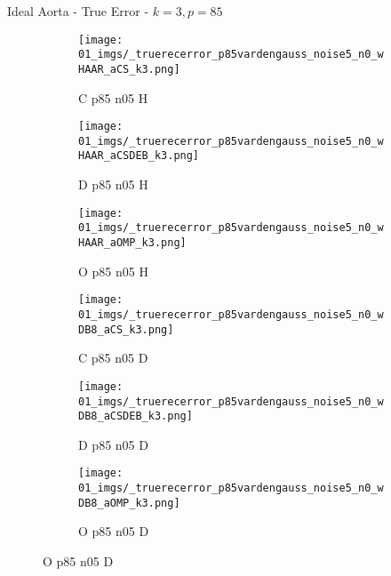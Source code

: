 \begin{frame}{Ideal Aorta - True Error - $k=3,p=85$}{}
\begin{figure}
\begin{subfigure}{0.13\textwidth}
\texttt{[image: 01\_imgs/\_truerecerror\_p85vardengauss\_noise5\_n0\_wHAAR\_aCS\_k3.png]}
\caption*{\tiny C p85 n05 H}
\end{subfigure}
\begin{subfigure}{0.13\textwidth}
\texttt{[image: 01\_imgs/\_truerecerror\_p85vardengauss\_noise5\_n0\_wHAAR\_aCSDEB\_k3.png]}
\caption*{\tiny D p85 n05 H}
\end{subfigure}
\begin{subfigure}{0.13\textwidth}
\texttt{[image: 01\_imgs/\_truerecerror\_p85vardengauss\_noise5\_n0\_wHAAR\_aOMP\_k3.png]}
\caption*{\tiny O p85 n05 H}
\end{subfigure}
\begin{subfigure}{0.13\textwidth}
\texttt{[image: 01\_imgs/\_truerecerror\_p85vardengauss\_noise5\_n0\_wDB8\_aCS\_k3.png]}
\caption*{\tiny C p85 n05 D}
\end{subfigure}
\begin{subfigure}{0.13\textwidth}
\texttt{[image: 01\_imgs/\_truerecerror\_p85vardengauss\_noise5\_n0\_wDB8\_aCSDEB\_k3.png]}
\caption*{\tiny D p85 n05 D}
\end{subfigure}
\begin{subfigure}{0.13\textwidth}
\texttt{[image: 01\_imgs/\_truerecerror\_p85vardengauss\_noise5\_n0\_wDB8\_aOMP\_k3.png]}
\caption*{\tiny O p85 n05 D}
\end{subfigure}

\vspace{5pt}


\end{figure}
\end{frame}
